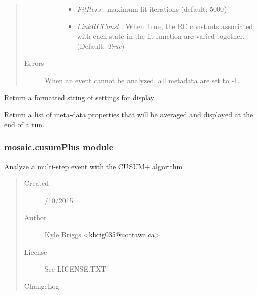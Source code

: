 \documentclass[letterpaper,10pt,english]{sphinxmanual}
\begin{document}
\begin{fulllineitems}
\begin{quote}
\begin{description}
\begin{description}
\begin{itemize}
\item {} 
\emph{FitIters} :                  maximum fit iterations (default: 5000)

\item {} 
\emph{LinkRCConst} :       When True, the RC constants associated with each state in the fit function are varied together. (Default: \emph{True})

\end{itemize}

\end{description}

\item[{Errors}] \leavevmode
When an event cannot be analyzed, all metadata are set to -1.

\end{description}\end{quote}

\begin{fulllineitems}
\label{api-doc/mosaic.processing:mosaic.adept.adept.formatsettings}
Return a formatted string of settings for display

\end{fulllineitems}


\begin{fulllineitems}
\label{api-doc/mosaic.processing:mosaic.adept.adept.mdAveragePropertiesList}
Return a list of meta-data properties that will be averaged 
and displayed at the end of a run.

\end{fulllineitems}


\end{fulllineitems}



\subsubsection{mosaic.cusumPlus module}
\label{api-doc/mosaic.processing:mosaic-cusumplus-module}\label{api-doc/mosaic.processing:module-mosaic.cusumPlus}
Analyze a multi-step event with the CUSUM+ algorithm
\begin{quote}\begin{description}
\item[{Created}] /10/2015

\item[{Author}] \leavevmode
Kyle Briggs \textless{}\href{mailto:kbrig035@uottawa.ca}{kbrig035@uottawa.ca}\textgreater{}

\item[{License}] \leavevmode
See LICENSE.TXT

\item[{ChangeLog}] \leavevmode
\end{description}\end{quote}
\end{document}
